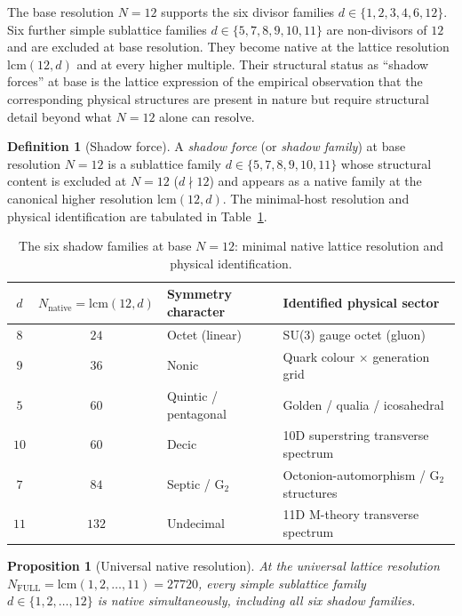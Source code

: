\documentclass[11pt,a4paper]{article}
\newtheorem{proposition}[theorem]{Proposition}
\theoremstyle{definition}
\newtheorem{definition}[theorem]{Definition}
\theoremstyle{remark}
\begin{document}
The base resolution $N=12$ supports the six divisor families $d\in\{1,2,3,4,6,12\}$. Six further simple sublattice families $d\in\{5,7,8,9,10,11\}$ are non-divisors of $12$ and are excluded at base resolution. They become native at the lattice resolution $\mathrm{lcm}(12,d)$ and at every higher multiple. Their structural status as ``shadow forces'' at base is the lattice expression of the empirical observation that the corresponding physical structures are present in nature but require structural detail beyond what $N=12$ alone can resolve.

\begin{definition}[Shadow force]\label{def:shadow-force}
A \emph{shadow force} (or \emph{shadow family}) at base resolution $N=12$ is a sublattice family $d \in \{5,7,8,9,10,11\}$ whose structural content is excluded at $N=12$ ($d \nmid 12$) and appears as a native family at the canonical higher resolution $\mathrm{lcm}(12,d)$. The minimal-host resolution and physical identification are tabulated in Table~\ref{tab:shadow-forces}.
\end{definition}

\begin{table}[ht]
\centering
\begin{tabular}{c|c|l|l}
\toprule
$d$ & $N_{\text{native}} = \mathrm{lcm}(12,d)$ & Symmetry character & Identified physical sector \\ \midrule
$8$  & $24$  & Octet (linear) & SU(3) gauge octet (gluon) \\
$9$  & $36$  & Nonic & Quark colour $\times$ generation grid \\
$5$  & $60$  & Quintic / pentagonal & Golden / qualia / icosahedral \\
$10$ & $60$  & Decic & 10D superstring transverse spectrum \\
$7$  & $84$  & Septic / G$_{2}$ & Octonion-automorphism / G$_{2}$ structures \\
$11$ & $132$ & Undecimal & 11D M-theory transverse spectrum \\ \bottomrule
\end{tabular}
\caption{The six shadow families at base $N=12$: minimal native lattice resolution and physical identification.}\label{tab:shadow-forces}
\end{table}

\begin{proposition}[Universal native resolution]\label{prop:universal-native}
At the universal lattice resolution $N_{\mathrm{FULL}} = \mathrm{lcm}(1,2,\ldots,11) = 27720$, every simple sublattice family $d \in \{1,2,\ldots,12\}$ is native simultaneously, including all six shadow families.
\end{proposition}
\end{document}
